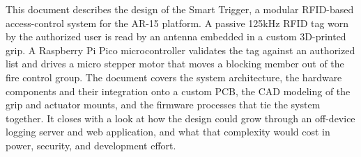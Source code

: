 This document describes the design of the Smart Trigger, a modular RFID-based
access-control system for the AR-15 platform. A passive 125kHz RFID tag worn
by the authorized user is read by an antenna embedded in a custom 3D-printed
grip. A Raspberry Pi Pico microcontroller validates the tag against an
authorized list and drives a micro stepper motor that moves a blocking member
out of the fire control group. The document covers the system architecture, the
hardware components and their integration onto a custom PCB, the CAD modeling
of the grip and actuator mounts, and the firmware processes that tie the system
together. It closes with a look at how the design could grow through an
off-device logging server and web application, and what that complexity would
cost in power, security, and development effort.